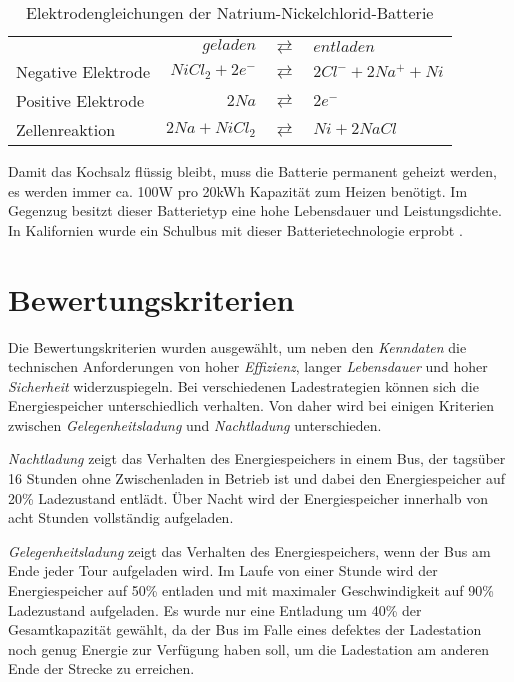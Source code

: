 \begin{table}\centering
	\begin{tabularx}{\linewidth}{XrcX}
		&       $geladen$ & $\rightleftarrows$ & $entladen$           \\
		Negative Elektrode & $NiCl_2 + 2e^-$ & $\rightleftarrows$ & $2Cl^- + 2Na^+ + Ni$ \\
		Positive Elektrode &           $2Na$ & $\rightleftarrows$ & $2e^-$               \\ \midrule
		Zellenreaktion     &  $2Na + NiCl_2$ & $\rightleftarrows$ & $Ni + 2NaCl$
	\end{tabularx}
	\caption{Elektrodengleichungen der Natrium-Nickelchlorid-Batterie}
	\label{ZEBRA}
\end{table}

Damit das Kochsalz flüssig bleibt, muss die Batterie permanent geheizt werden, es werden immer ca. 100W pro 20kWh Kapazität zum Heizen benötigt. Im Gegenzug besitzt dieser Batterietyp eine hohe Lebensdauer und Leistungsdichte. In Kalifornien wurde ein Schulbus mit dieser Batterietechnologie erprobt \cite{Electric-Transportation-Department:2004}.

\section{Bewertungskriterien}
Die Bewertungskriterien wurden ausgewählt, um neben den \emph{Kenndaten} die technischen Anforderungen von hoher \emph{Effizienz}, langer \emph{Lebensdauer} und hoher \emph{Sicherheit} widerzuspiegeln. Bei verschiedenen Ladestrategien können sich die Energiespeicher unterschiedlich verhalten. Von daher wird bei einigen Kriterien zwischen \emph{Gelegenheitsladung} und \emph{Nachtladung} unterschieden.

\emph{Nachtladung} zeigt das Verhalten des Energiespeichers in einem Bus, der tagsüber 16 Stunden ohne Zwischenladen in Betrieb ist und dabei den Energiespeicher auf 20\% Ladezustand entlädt. Über Nacht wird der Energiespeicher innerhalb von acht Stunden vollständig aufgeladen.

\emph{Gelegenheitsladung} zeigt das Verhalten des Energiespeichers, wenn der Bus am Ende jeder Tour aufgeladen wird. Im Laufe von einer Stunde wird der Energiespeicher auf 50\% entladen und mit maximaler Geschwindigkeit auf 90\% Ladezustand aufgeladen. Es wurde nur eine Entladung um 40\% der Gesamtkapazität gewählt, da der Bus im Falle eines defektes der Ladestation noch genug Energie zur Verfügung haben soll, um die Ladestation am anderen Ende der Strecke zu erreichen.

